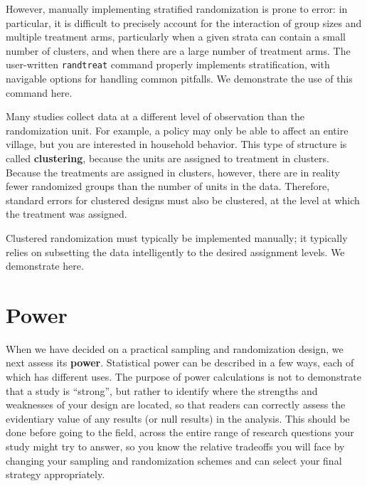 However, manually implementing stratified randomization
is prone to error: in particular, it is difficult to precisely account
for the interaction of group sizes and multiple treatment arms,
particularly when a given strata can contain a small number of clusters,
and when there are a large number of treatment arms.\cite{carril2017dealing}
The user-written \texttt{randtreat} command
properly implements stratification,
with navigable options for handling common pitfalls.
We demonstrate the use of this command here.


Many studies collect data at a different level of observation than the randomization unit.
For example, a policy may only be able to affect an entire village,
but you are interested in household behavior.
This type of structure is called \textbf{clustering},
because the units are assigned to treatment in clusters.
Because the treatments are assigned in clusters, however,
there are in reality fewer randomized groups than the number of units in the data.
Therefore, standard errors for clustered designs must also be clustered,
at the level at which the treatment was assigned.

Clustered randomization must typically be implemented manually;
it typically relies on subsetting the data intelligently
to the desired assignment levels.
We demonstrate here.


\section{Power}

When we have decided on a practical sampling and randomization design,
we next assess its \textbf{power}.
Statistical power can be described in a few ways,
each of which has different uses.
The purpose of power calculations is not to
demonstrate that a study is ``strong'',
but rather to identify where the strengths and weaknesses
of your design are located, so that readers
can correctly assess the evidentiary value of
any results (or null results) in the analysis.
This should be done before going to the field,
across the entire range of research questions
your study might try to answer,
so you know the relative tradeoffs you will face
by changing your sampling and randomization schemes
and can select your final strategy appropriately.

